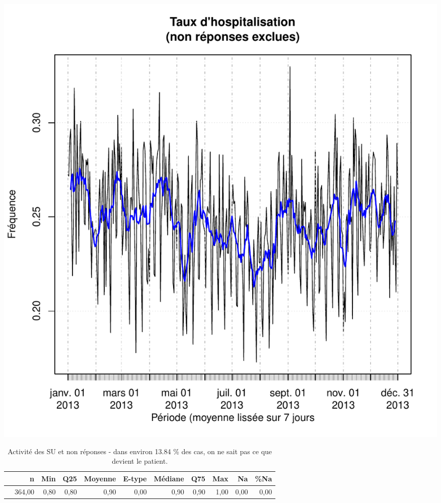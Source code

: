 \documentclass[12pt,english,french,twoside]{book}\usepackage[]{graphicx}\usepackage[]{color}
\makeatletter
\def\maxwidth{ %
  \ifdim\Gin@nat@width>\linewidth
    \linewidth
  \else
    \Gin@nat@width
  \fi
}
\makeatother
\begin{document}
\includegraphics[width=\maxwidth]{figure/hospit-1} 



\begin{table}[ht]
\centering
\begin{tabular}{rrrrrrrrrrr}
  \hline
 & n & Min & Q25 & Moyenne & E-type & Médiane & Q75 & Max & Na & \%Na \\ 
  \hline
 & 364,00 & 0,80 & 0,80 & 0,90 & 0,00 & 0,90 & 0,90 & 1,00 & 0,00 & 0,00 \\ 
   \hline
\end{tabular}
\caption[Activité des SU et non réponses]{Activité des SU et non réponses - dans environ 13.84 \% des cas, on ne sait pas ce que devient le patient.} 
\label{tab:NAsu}
\end{table}
\end{document}
